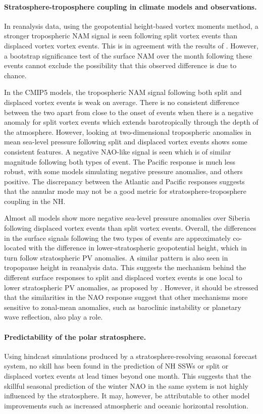 \paragraph{Stratosphere-troposphere coupling in climate models and
  observations.}  In reanalysis data, using the geopotential height-based vortex
moments method, a stronger tropospheric NAM signal is seen following split
vortex events than displaced vortex vortex events. This is in agreement with the
results of \citet{Mitchell2013}. However, a bootstrap significance test of the
surface NAM over the month following these events cannot exclude the possibility
that this observed difference is due to chance.

In the CMIP5 models, the tropospheric NAM signal following both split and
displaced vortex events is weak on average. There is no consistent difference
between the two apart from close to the onset of events when there is a negative
anomaly for split vortex events which extends barotropically through the depth
of the atmosphere. However, looking at two-dimensional tropospheric anomalies in
mean sea-level pressure following split and displaced vortex events shows some
consistent features. A negative NAO-like signal is seen which is of similar
magnitude following both types of event. The Pacific response is much less
robust, with some models simulating negative pressure anomalies, and others
positive. The discrepancy between the Atlantic and Pacific responses suggests
that the annular mode may not be a good metric for stratosphere-troposphere
coupling in the NH.

Almost all models show more negative sea-level pressure anomalies over Siberia
following displaced vortex events than split vortex events. Overall, the
differences in the surface signals following the two types of events are
approximately co-located with the difference in lower-stratospheric geopotential
height, which in turn follow stratospheric PV anomalies. A similar pattern is
also seen in tropopause height in reanalysis data. This suggests the mechanism
behind the different surface responses to split and displaced vortex events is
one local to lower stratospheric PV anomalies, as proposed by
\citet{Ambaum2002}. However, it should be stressed that the similarities in the
NAO response suggest that other mechanisms more sensitive to zonal-mean
anomalies, such as baroclinic instability or planetary wave reflection, also
play a role.

\paragraph{Predictability of the polar stratosphere.} Using hindcast simulations
produced by a stratosphere-resolving seasonal forecast system, no skill has been
found in the prediction of NH SSWs or split or displaced vortex events at lead
times beyond one month. This suggests that the skillful seasonal prediction of
the winter NAO in the same system \citep{Scaife2013} is not highly influenced by
the stratosphere. It may, however, be attributable to other model improvements
such as increased atmospheric and oceanic horizontal resolution.

